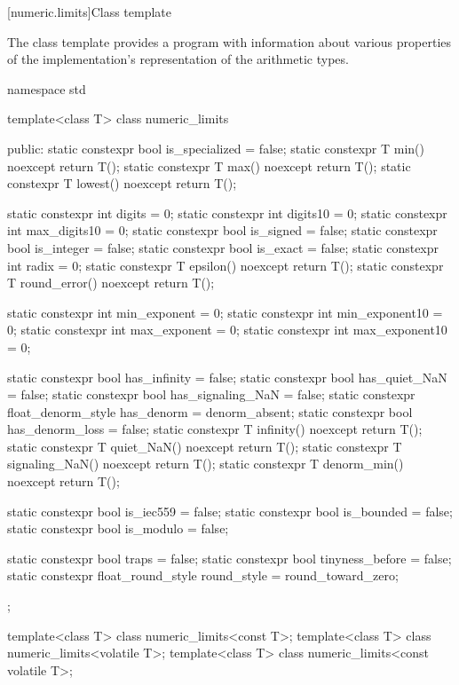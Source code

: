 [numeric.limits]{Class template }

\pnum
The
%
class template provides a \Cpp{} program with information about various properties of
the implementation's representation of the
arithmetic types.

%
\begin{codeblock}
namespace std {
  template<class T> class numeric_limits {
  public:
    static constexpr bool is_specialized = false;
    static constexpr T min() noexcept { return T(); }
    static constexpr T max() noexcept { return T(); }
    static constexpr T lowest() noexcept { return T(); }

    static constexpr int  digits = 0;
    static constexpr int  digits10 = 0;
    static constexpr int  max_digits10 = 0;
    static constexpr bool is_signed = false;
    static constexpr bool is_integer = false;
    static constexpr bool is_exact = false;
    static constexpr int  radix = 0;
    static constexpr T epsilon() noexcept { return T(); }
    static constexpr T round_error() noexcept { return T(); }

    static constexpr int  min_exponent = 0;
    static constexpr int  min_exponent10 = 0;
    static constexpr int  max_exponent = 0;
    static constexpr int  max_exponent10 = 0;

    static constexpr bool has_infinity = false;
    static constexpr bool has_quiet_NaN = false;
    static constexpr bool has_signaling_NaN = false;
    static constexpr float_denorm_style has_denorm = denorm_absent;
    static constexpr bool has_denorm_loss = false;
    static constexpr T infinity() noexcept { return T(); }
    static constexpr T quiet_NaN() noexcept { return T(); }
    static constexpr T signaling_NaN() noexcept { return T(); }
    static constexpr T denorm_min() noexcept { return T(); }

    static constexpr bool is_iec559 = false;
    static constexpr bool is_bounded = false;
    static constexpr bool is_modulo = false;

    static constexpr bool traps = false;
    static constexpr bool tinyness_before = false;
    static constexpr float_round_style round_style = round_toward_zero;
  };

  template<class T> class numeric_limits<const T>;
  template<class T> class numeric_limits<volatile T>;
  template<class T> class numeric_limits<const volatile T>;
}
\end{codeblock}

